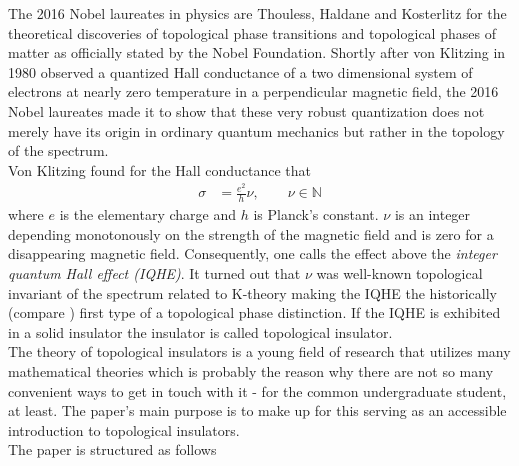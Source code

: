 \nocite{eda79af1}
\nocite{fd8cbb36}
\nocite{1706ae98}
The 2016 Nobel laureates in physics are Thouless, Haldane and Kosterlitz {\glqq}for the theoretical discoveries of topological phase transitions and topological phases of matter{\grqq} as officially stated by the Nobel Foundation. Shortly after von Klitzing in 1980 observed a quantized Hall conductance of a two dimensional system of electrons at nearly zero temperature in a perpendicular magnetic field, the 2016 Nobel laureates made it to show that these very robust quantization does not merely have its origin in ordinary quantum mechanics but rather in the topology of the spectrum.
\\
Von Klitzing found for the Hall conductance that
\begin{align*}
  \sigma
  &=
  \frac{e^{2}}{h}
  \nu
  ,\qquad
  \nu
  \in
  \mathbb{N}
\end{align*}
where $e$ is the elementary charge and $h$ is Planck's constant. $\nu$ is an integer depending monotonously on the strength of the magnetic field and is zero for a disappearing magnetic field. Consequently, one calls the effect above the \textit{integer quantum Hall effect (IQHE)}. It turned out that $\nu$ was well-known topological invariant of the spectrum related to K-theory making the IQHE the historically (compare \cite{1706ae98}) first type of a topological phase distinction. If the IQHE is exhibited in a solid insulator the insulator is called topological insulator.
\\
The theory of topological insulators is a young field of research that utilizes many mathematical theories which is probably the reason why there are not so many convenient ways to get in touch with it - for the common undergraduate student, at least. The paper's main purpose is to make up for this serving as an accessible introduction to topological insulators.
\\
The paper is structured as follows

